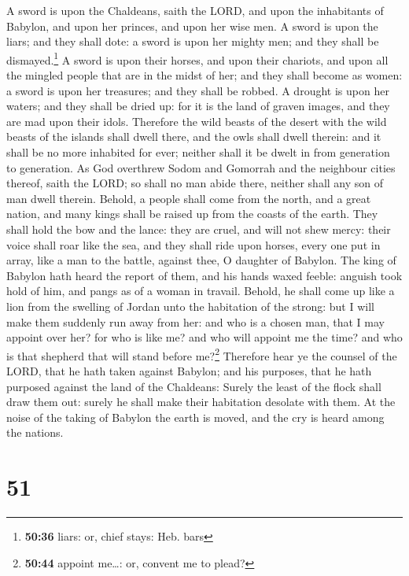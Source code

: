  A sword is upon the Chaldeans, saith the LORD, and upon
the inhabitants of Babylon, and upon her princes, and upon her wise men.
 A sword is upon the liars; and they shall dote: a sword
is upon her mighty men; and they shall be dismayed.\footnote{\textbf{50:36}
  liars: or, chief stays: Heb. bars}  A sword is upon
their horses, and upon their chariots, and upon all the mingled people
that are in the midst of her; and they shall become as women: a sword is
upon her treasures; and they shall be robbed.  A drought
is upon her waters; and they shall be dried up: for it is the land of
graven images, and they are mad upon their idols. 
Therefore the wild beasts of the desert with the wild beasts of the
islands shall dwell there, and the owls shall dwell therein: and it
shall be no more inhabited for ever; neither shall it be dwelt in from
generation to generation.  As God overthrew Sodom and
Gomorrah and the neighbour cities thereof, saith the LORD; so shall no
man abide there, neither shall any son of man dwell therein.
 Behold, a people shall come from the north, and a great
nation, and many kings shall be raised up from the coasts of the earth.
 They shall hold the bow and the lance: they are cruel,
and will not shew mercy: their voice shall roar like the sea, and they
shall ride upon horses, every one put in array, like a man to the
battle, against thee, O daughter of Babylon.  The king of
Babylon hath heard the report of them, and his hands waxed feeble:
anguish took hold of him, and pangs as of a woman in travail.
 Behold, he shall come up like a lion from the swelling
of Jordan unto the habitation of the strong: but I will make them
suddenly run away from her: and who is a chosen man, that I may appoint
over her? for who is like me? and who will appoint me the time? and who
is that shepherd that will stand before me?\footnote{\textbf{50:44}
  appoint me\ldots: or, convent me to plead?}  Therefore
hear ye the counsel of the LORD, that he hath taken against Babylon; and
his purposes, that he hath purposed against the land of the Chaldeans:
Surely the least of the flock shall draw them out: surely he shall make
their habitation desolate with them.  At the noise of the
taking of Babylon the earth is moved, and the cry is heard among the
nations.

\hypertarget{section-50}{%
\section{51}\label{section-50}}

